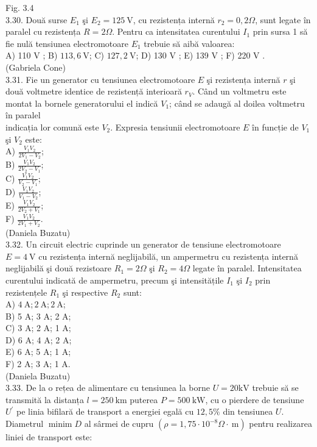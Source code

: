 \documentclass[10pt]{article}
\begin{document}
Fig. 3.4\\
3.30. Două surse $E_{1}$ şi $E_{2}=125 \mathrm{~V}$, cu rezistența internă $r_{2}=0,2 \Omega$, sunt legate în paralel cu rezistența $R=2 \Omega$. Pentru ca intensitatea curentului $I_{1}$ prin sursa 1 să fie nulă tensiunea electromotoare $E_{1}$ trebuie să aibă valoarea:\\
A) 110 V ; B) $113,6 \mathrm{~V}$; C) $127,2 \mathrm{~V}$; D) 130 V ; E) 139 V ; F) 220 V .\\
(Gabriela Cone)\\
3.31. Fie un generator cu tensiunea electromotoare $E$ şi rezistența internă $r$ şi două voltmetre identice de rezistență interioară $r_{V}$. Când un voltmetru este montat la bornele generatorului el indică $V_{1}$; când se adaugă al doilea voltmetru în paralel\\
indicația lor comună este $V_{2}$. Expresia tensiunii electromotoare $E$ în funcție de $V_{1}$ şi $V_{2}$ este:\\
A) $\frac{V_{1} V_{2}}{2 V_{1}-V_{2}}$;\\
B) $\frac{V_{1} V_{2}}{2 V_{2}-V_{1}}$;\\
C) $\frac{V_{1} V_{2}}{V_{2}-V_{1}}$;\\
D) $\frac{V_{1} V_{2}}{V_{1}-V_{2}}$;\\
E) $\frac{V_{1} V_{2}}{2 V_{2}+V_{1}}$;\\
F) $\frac{V_{1} V_{2}}{2 V_{1}+V_{2}}$.\\
(Daniela Buzatu)\\
3.32. Un circuit electric cuprinde un generator de tensiune electromotoare $E=4 \mathrm{~V}$ cu rezistența internă neglijabilă, un ampermetru cu rezistența internă neglijabilă şi două rezistoare $R_{1}=2 \Omega$ şi $R_{2}=4 \Omega$ legate în paralel. Intensitatea curentului indicată de ampermetru, precum şi intensitățile $I_{1}$ şi $I_{2}$ prin rezistențele $R_{1}$ şi respective $R_{2}$ sunt:\\
A) $4 \mathrm{~A} ; 2 \mathrm{~A} ; 2 \mathrm{~A}$;\\
B) 5 A; 3 A; 2 A;\\
C) 3 A; 2 A; 1 A;\\
D) 6 A; 4 A; 2 A;\\
E) 6 A; 5 A; 1 A;\\
F) 2 A; 3 A; 1 A.\\
(Daniela Buzatu)\\
3.33. De la o rețea de alimentare cu tensiunea la borne $U=20 \mathrm{kV}$ trebuie să se transmită la distanța $l=250 \mathrm{~km}$ puterea $P=500 \mathrm{~kW}$, cu o pierdere de tensiune $U^{\prime}$ pe linia bifilară de transport a energiei egală cu $12,5 \%$ din tensiunea $U$. Diametrul $\operatorname{minim} D$ al sârmei de cupru $\left(\rho=1,75 \cdot 10^{-8} \Omega \cdot \mathrm{~m}\right)$ pentru realizarea liniei de transport este:\\
\end{document}
